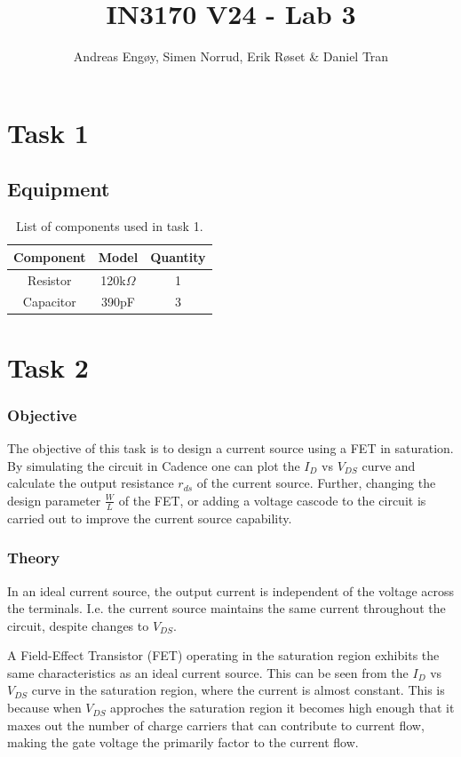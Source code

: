 \documentclass[onecolumn]{article}
\title{IN3170 V24 - Lab 3}
\author{Andreas Engøy, Simen Norrud, Erik Røset \& Daniel Tran}
\date{\monthname[\the\month] \the\year}
\begin{document}
\maketitle


\section{Task 1}
\subsection{Equipment}
\begin{table}[h]
    \centering
    \begin{tabular}{|c|c|c|}
        \hline
        \textbf{Component} & \textbf{Model} & \textbf{Quantity} \\
        \hline
        Resistor & 120k$\Omega$ & 1 \\
        Capacitor & 390pF & 3 \\
        \hline
    \end{tabular}
    \caption{List of components used in task 1.}
    \label{tab:bom}
\end{table}



\section{Task 2}

\subsubsection*{Objective}
The objective of this task is to design a current source using a FET in saturation. By simulating the circuit in Cadence one can plot the $I_D$ vs $V_{DS}$ curve and calculate the output resistance $r_{ds}$ of the current source. Further, changing the design parameter $\frac{W}{L}$ of the FET, or adding a voltage cascode to the circuit is carried out to improve the current source capability.

\subsubsection*{Theory}
In an ideal current source, the output current is independent of the voltage across the terminals. I.e. the current source maintains the same current throughout the circuit, despite changes to $V_{DS}$.

A Field-Effect Transistor (FET) operating in the saturation region exhibits the same characteristics as an ideal current source. This can be seen from the $I_D$ vs $V_{DS}$ curve in the saturation region, where the current is almost constant. This is because when  $V_{DS}$ approches the saturation region it becomes high enough that it maxes out the number of charge carriers that can contribute to current flow, making the gate voltage the primarily factor to the current flow.
\end{document}
